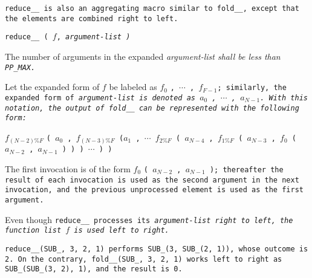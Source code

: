 \tt{reduce__} is also an aggregating macro similar to \tt{fold__},
except that the elements are combined right to left.


\tt{reduce__ (} $f$, \it{argument-list} \tt{)}


The number of arguments in the expanded
\it{argument-list} shall be less than \tt{PP_MAX}.


Let the expanded form of $f$ be labeled as $f_0$ \tt{,} $\cdots$ \tt{,} $f_{F-1}$;
similarly, the expanded form of \it{argument-list}
is denoted as $a_0$ \tt{,} $\cdots$ \tt{,} $a_{N-1}$.
With this notation, the output of \tt{fold__}
can be represented with the following form:

\centerline
{
$f_{(N - 2)\%F}$ \tt{(} $a_0$ \tt{,} $f_{(N - 3)\%F}$ \tt{(}$a_1$ \tt{,} $\cdots$
$f_{2\%F}$ \tt{(} $a_{N - 4}$ \tt{,} $f_{1\%F}$ \tt{(} $a_{N - 3}$ \tt{,} $f_0$
\tt{(} $a_{N - 2}$ \tt{,} $a_{N - 1}$ \tt{)} \tt{)} \tt{)} $\cdots$ \tt{)} \tt{)}
}

The first invocation is of the form
$f_0$ \tt{(} $a_{N - 2}$ \tt{,} $a_{N - 1}$ \tt{)}; thereafter the result
of each invocation is used as the second argument in the next invocation,
and the previous unprocessed element is used as the first argument.

\note Even though \tt{reduce__} processes its \it{argument-list}
right to left, the function list $f$ is used left to right.

\example \tt{reduce__(SUB_, 3, 2, 1)} performs
\tt{SUB_(3, SUB_(2, 1))}, whose outcome is \tt{2}.
On the contrary, \tt{fold__(SUB_, 3, 2, 1)} works left to
right as \tt{SUB_(SUB_(3, 2), 1)}, and the result is \tt{0}.
